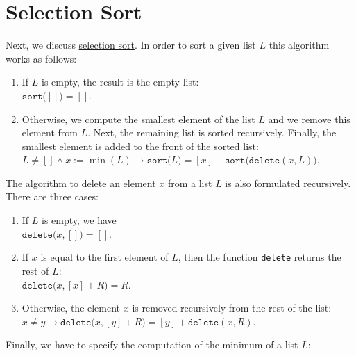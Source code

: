 \section{Selection Sort}
Next, we discuss 
\href{http://en.wikipedia.org/wiki/Selection_sort}{selection sort}.  In order to sort a
given list $L$ this algorithm works as
follows:
\begin{enumerate}
\item If $L$ is empty, the result is the empty list: \\[0.2cm]
      \hspace*{1.3cm} $\mathtt{sort}\bigl([]\bigr) = []$.
\item Otherwise, we compute the smallest element of the list $L$ and we remove this element from
      $L$.  Next, the remaining list is sorted recursively.  Finally, the smallest element is added
      to the front of the sorted list:
      \\[0.2cm]
      \hspace*{1.3cm} 
      $L \not= [] \wedge x := \min(L) \rightarrow \mathtt{sort}\bigl(L\bigr) = [x] + \mathtt{sort}\bigl(\mathtt{delete}(x, L)\bigr)$.
\end{enumerate}
The algorithm to delete an element $x$ from a list $L$ is also formulated recursively.  There are three cases:
\begin{enumerate}
\item If $L$ is empty, we have \\[0.2cm]
      \hspace*{1.3cm} $\mathtt{delete}\bigl(x, []\bigr) = []$.
\item If $x$ is equal to the first element of $L$, then the function \texttt{delete} returns the
      rest of $L$: \\[0.2cm]
      \hspace*{1.3cm} 
      $\mathtt{delete}\bigl(x, [x] + R\bigr) = R$.
\item Otherwise, the element $x$ is removed recursively from the rest of the list: \\[0.2cm]
      \hspace*{1.3cm}   
      $x \not = y \rightarrow \mathtt{delete}\bigl(x, [y] + R\bigr) = [y] + \mathtt{delete}(x,R)$.
\end{enumerate}
Finally, we have to specify the computation of the minimum of a list $L$:
